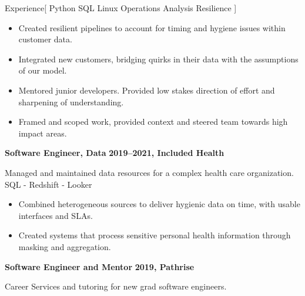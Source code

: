 \documentclass[11pt,a4paper]{article}
\begin{document}
\begin{mysection}{Experience}[
    Python
    \textbullet{} SQL
    \textbullet{} Linux
    \textbullet{} Operations
    \textbullet{} Analysis
    \textbullet{} Resilience
]
\begin{addmargin}[0.5em]{0em}
\begin{adjustwidth}{1ex}{0ex}
      \begin{itemize}
        [label=-, topsep=0pt, itemsep=0.5ex, parsep=0pt, leftmargin=1em]
      \item Created resilient pipelines to account for timing and hygiene issues
            within customer data.
      \item Integrated new customers, bridging quirks in their data with the
            assumptions of our model.
      \item Mentored junior developers.  Provided low stakes direction of effort
            and sharpening of understanding.
      \item Framed and scoped work, provided context and steered team towards
            high impact areas.
      \end{itemize}
    \end{adjustwidth}
  \end{addmargin}
  \medskip


  \begin{addmargin}[0.5em]{0em}
    {\large\bfseries Software Engineer, Data}%
    \hfill {\bfseries 2019--2021, Included Health}%
      \begin{adjustwidth}{1ex}{0ex}
      Managed and maintained data resources for a complex health care
      organization.\\
      SQL - Redshift - Looker

      \begin{itemize}
        [label=-, topsep=0pt, itemsep=0.5ex, parsep=0pt, leftmargin=1em]
      \item Combined heterogeneous sources to deliver hygienic data on time,
          with usable interfaces and SLAs.
      \item Created systems that process sensitive personal health information
            through masking and aggregation.
      \end{itemize}
      \end{adjustwidth}
    \end{addmargin}
    \medskip


    \begin{addmargin}[0.5em]{0em}
    {\large\bfseries Software Engineer and Mentor}
    \hfill {\bfseries 2019, Pathrise}%
      \begin{adjustwidth}{1ex}{0ex}
      \hspace*{0ex}Career Services and tutoring for new grad software engineers.
      \end{adjustwidth}


\end{addmargin}
\end{mysection}
\end{document}

